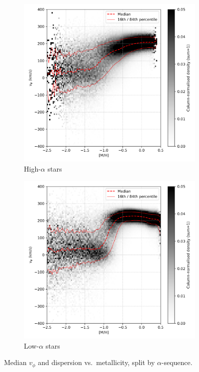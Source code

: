 \documentclass[a4paper,10pt]{article}
\begin{document}
\begin{multicols}{2}
\begin{figure}[H]
  \centering
  \begin{subfigure}[t]{0.48\linewidth}
    \includegraphics[width=\linewidth]{../figures/vis_mh_vphi_high_alpha.png}
    \caption{High-$\alpha$ stars}
  \end{subfigure}
  \hfill
  \begin{subfigure}[t]{0.48\linewidth}
    \includegraphics[width=\linewidth]{../figures/vis_mh_vphi_low_alpha.png}
    \caption{Low-$\alpha$ stars}
  \end{subfigure}
  \caption{Median $v_\phi$ and dispersion vs.\ metallicity, split by $\alpha$-sequence.}
  \label{fig:mh_vphi_alpha}
\end{figure}


\end{multicols}
\end{document}
